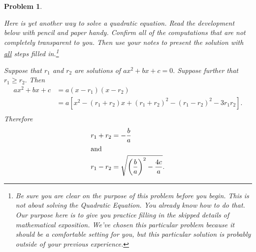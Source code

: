 \documentclass[oneside]{book}
\def\LabelProblem#1#2{\label{#1}\addcontentsline{toc}{subsection}{\hskip1cm Problem~\ref{#1}}}
\newtheorem{problem}{Problem}
\begin{document}
\begin{problem}
\LabelProblem{prob:Quadratic Formula-Lagrange's Method}{Quadratic Formula!Second Alternate Method}
Here is yet another way to solve a quadratic equation. Read the
development below with pencil and paper handy. Confirm all of the
computations that are not completely transparent to you. Then use your
notes to present the solution with \underline{all} steps filled
in.\footnote{Be sure you are clear on the purpose of this problem
  before you begin. This is not about solving the Quadratic
  Equation. You already know how to do that. Our purpose here is to
  give you practice filling in the skipped details of mathematical
  exposition. We've chosen this particular problem because it should
  be a comfortable setting for you, but this particular solution is
  probably outside of your previous experience.}

Suppose that $r_1$ and $r_2$ are solutions of $ax^2+bx+c=0.$ Suppose
further that $r_1\ge r_2.$ Then
\begin{align*}
  ax^2+bx+c &= a(x-r_1)(x-r_2)\\
  &= a\left[x^2-(r_1+r_2)x+(r_1+r_2)^2-(r_1-r_2)^2-3r_1r_2\right].\\
\end{align*}
Therefore
\begin{align}
  \label{eq:LagrangeQuadratic1}
  r_1+r_2&= -\frac{b}{a}\\
\intertext{and}
  \label{eq:LagrangeQuadratic2}  r_1-r_2 &= \sqrt{\left(\frac{b}{a}\right)^2-\frac{4c}{a}}.
\end{align}


\end{problem}
\end{document}
